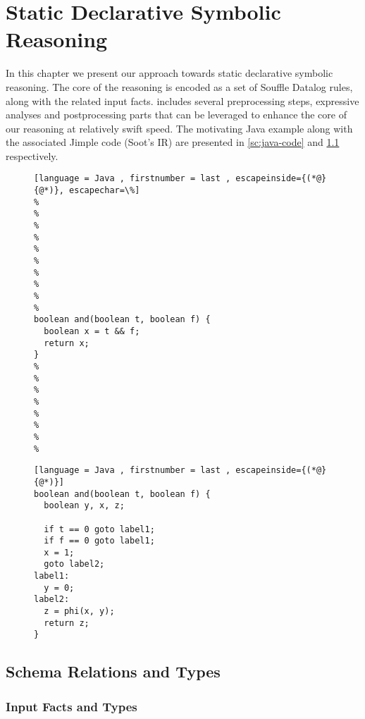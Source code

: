 \chapter{Static Declarative Symbolic Reasoning}\label{c:main-content}

In this chapter we present our approach towards static declarative
symbolic reasoning. The core of the reasoning is encoded as a
set of Souffle Datalog rules, along with the related input facts.
\doop{} includes several preprocessing steps, expressive analyses and
postprocessing parts that can be leveraged to enhance the core of
our reasoning at relatively swift speed. The motivating Java example
along with the associated Jimple code (Soot's IR) are presented in
\ref{sc:java-code} and \ref{sc:soot-code} respectively.

\begin{figure}[th]
  \begin{minipage}{.5\textwidth}
\begin{lstlisting}[language = Java , firstnumber = last , escapeinside={(*@}{@*)}, escapechar=\%]
%
%
%
%
%
%
%
%
%
%
boolean and(boolean t, boolean f) {
  boolean x = t && f;
  return x;
}
%
%
%
%
%
%
%
%

\end{lstlisting}
\label{sc:java-code}
\end{minipage}\hfill
\begin{minipage}{.5\textwidth}
\begin{lstlisting}[language = Java , firstnumber = last , escapeinside={(*@}{@*)}]
boolean and(boolean t, boolean f) {
  boolean y, x, z;

  if t == 0 goto label1;
  if f == 0 goto label1;
  x = 1;
  goto label2;
label1:
  y = 0;
label2:
  z = phi(x, y);
  return z;
}
\end{lstlisting}
\label{sc:soot-code}
\end{minipage}
\end{figure}


\section{Schema Relations and Types}\label{s:schema-relations-types}

\subsection{Input Facts and Types}

